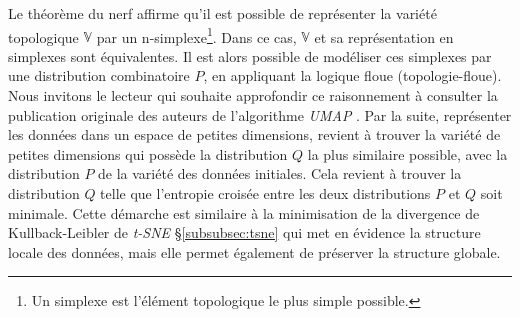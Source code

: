 Le théorème du nerf \cite{zisman_topologie_1972} affirme qu'il est possible de représenter la variété topologique $\mathbb{V}$ par un n-simplexe\footnote{Un simplexe est l'élément topologique le plus simple possible.}.
Dans ce cas, $\mathbb{V}$ et sa représentation en simplexes sont équivalentes.
Il est alors possible de modéliser ces simplexes par une distribution combinatoire $P$, en appliquant la logique floue (topologie-floue).
Nous invitons le lecteur qui souhaite approfondir ce raisonnement à consulter la publication originale des auteurs de l'algorithme \textit{UMAP} \cite{mcinnes_umap_2018}.
Par la suite, représenter les données dans un espace de petites dimensions, revient à trouver la variété de petites dimensions qui possède la distribution $Q$ la plus similaire possible, avec la distribution $P$ de la variété des données initiales.
Cela revient à trouver la distribution $Q$ telle que l'entropie croisée entre les deux distributions $P$ et $Q$ soit minimale.
Cette démarche est similaire à la minimisation de la divergence de Kullback-Leibler de \textit{t-SNE} §\ref{subsubsec:tsne} qui met en évidence la structure locale des données, mais elle permet également de préserver la structure globale.

